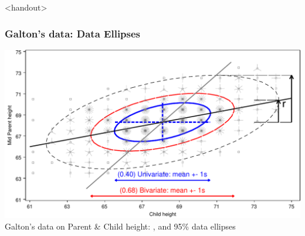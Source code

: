 \begin{frame}<handout>
  \frametitle{Galton's data: Data Ellipses}
  \begin{center}
  \includegraphics[width=.9\textwidth,clip]{fig/galton-reg3}
  \\ Galton's data on Parent \& Child height: ,  and 95\% data ellipses
  \end{center}
\end{frame}

